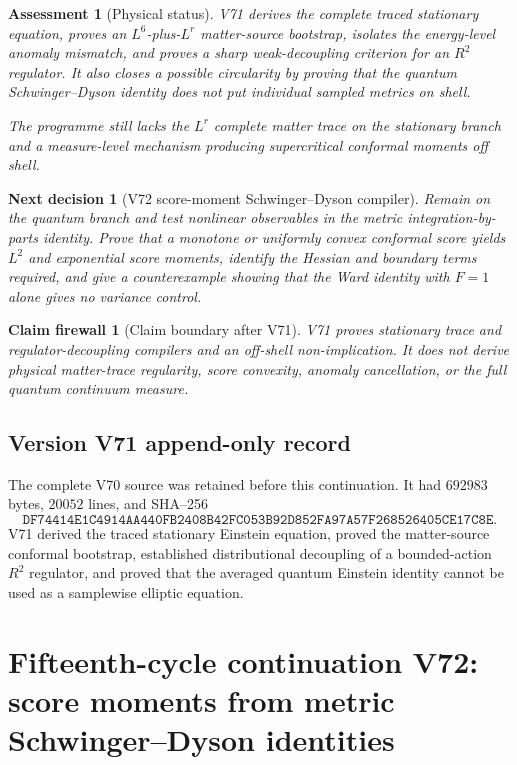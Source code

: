 \documentclass[11pt]{article}
\newtheorem{firewall}[theorem]{Claim firewall}
\newtheorem{decision}[theorem]{Next decision}
\newtheorem{assessment}[theorem]{Assessment}
\theoremstyle{remark}
\begin{document}
\begin{assessment}[Physical status]
\label{ass:v15v71-status}
V71 derives the complete traced stationary equation, proves an
\(L^6\)-plus-\(L^r\) matter-source bootstrap, isolates the
energy-level anomaly mismatch, and proves a sharp weak-decoupling
criterion for an \(R^2\) regulator.  It also closes a possible
circularity by proving that the quantum Schwinger--Dyson identity
does not put individual sampled metrics on shell.

The programme still lacks the \(L^r\) complete matter trace on the
stationary branch and a measure-level mechanism producing
supercritical conformal moments off shell.
\end{assessment}

\begin{decision}[V72 score-moment Schwinger--Dyson compiler]
\label{dec:v15v71-next}
Remain on the quantum branch and test nonlinear observables in the
metric integration-by-parts identity.  Prove that a monotone or
uniformly convex conformal score yields \(L^2\) and exponential
score moments, identify the Hessian and boundary terms required,
and give a counterexample showing that the Ward identity with
\(F=1\) alone gives no variance control.
\end{decision}

\begin{firewall}[Claim boundary after V71]
\label{fire:v15v71}
V71 proves stationary trace and regulator-decoupling compilers and
an off-shell non-implication.  It does not derive physical
matter-trace regularity, score convexity, anomaly cancellation, or
the full quantum continuum measure.
\end{firewall}

\section*{Version V71 append-only record}
The complete V70 source was retained before this continuation.  It
had \(692983\) bytes, \(20052\) lines, and SHA--256
\[
 \texttt{DF74414E1C4914AA440FB2408B42FC053B92D852FA97A57F268526405CE17C8E}.
\]
V71 derived the traced stationary Einstein equation, proved the
matter-source conformal bootstrap, established distributional
decoupling of a bounded-action \(R^2\) regulator, and proved that
the averaged quantum Einstein identity cannot be used as a
samplewise elliptic equation.

\chapter{Fifteenth-cycle continuation V72: score moments from metric Schwinger--Dyson identities}
\label{sec:v15v72}
\end{document}
